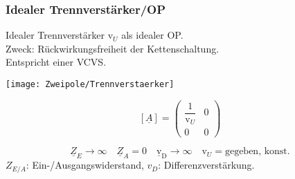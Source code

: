 \subsubsection{Idealer Trennverst\"arker/OP} \label{trennverstärker}
Idealer Trennverstärker  $\text{v}_U$ als idealer OP.\\ 
Zweck: Rückwirkungsfreiheit der Kettenschaltung.\\
Entspricht einer VCVS.\\
\begin{minipage}{0.5\columnwidth}
\texttt{[image: Zweipole/Trennverstaerker]}
\end{minipage}
\begin{minipage}{0.5\columnwidth}
	\renewcommand*{\arraystretch}{1.7}
	\[
	[\underline{A}] = \begin{pmatrix}
		\dfrac{1}{\text{v}_U} & 0 \\
		0        & 0
	\end{pmatrix}
	\]
\end{minipage}

\begin{equation*}
	\boxed{
	\underline{Z}_E \rightarrow \infty \quad \underline{Z}_A = 0 \quad \underline{\text{v}}_{\text{D}}\rightarrow \infty \quad \text{v}_U = \text{gegeben, konst.}}
\end{equation*}
{\small
	$Z_{E/A}$: Ein-/Ausgangswiderstand, $v_D$: Differenzverstärkung.
}
